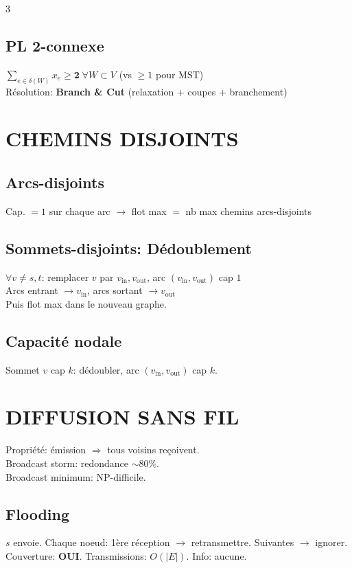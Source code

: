 \documentclass[a4paper,4pt]{article}
\begin{document}
\begin{multicols}{3}
\subsection{PL 2-connexe}
$\sum_{e\in\delta(W)}x_e\geq \mathbf{2}\;\forall W\subset V$ (vs $\geq 1$ pour MST)\\
R\'esolution: \textbf{Branch \& Cut} (relaxation + coupes + branchement)

\section{CHEMINS DISJOINTS}

\subsection{Arcs-disjoints}
Cap. $=1$ sur chaque arc $\to$ flot max $=$ nb max chemins arcs-disjoints

\subsection{Sommets-disjoints: D\'edoublement}
$\forall v\neq s,t$: remplacer $v$ par $v_{\text{in}},v_{\text{out}}$, arc $(v_{\text{in}},v_{\text{out}})$ cap $1$\\
Arcs entrant $\to v_{\text{in}}$, arcs sortant $\to v_{\text{out}}$\\
Puis flot max dans le nouveau graphe.

\subsection{Capacit\'e nodale}
Sommet $v$ cap $k$: d\'edoubler, arc $(v_{\text{in}},v_{\text{out}})$ cap $k$.

\section{DIFFUSION SANS FIL}

Propri\'et\'e: \'emission $\Rightarrow$ tous voisins re\c{c}oivent.\\
Broadcast storm: redondance $\sim$80\%.\\
Broadcast minimum: NP-difficile.

\subsection{Flooding}
$s$ envoie. Chaque noeud: 1\`ere r\'eception $\to$ retransmettre. Suivantes $\to$ ignorer.\\
Couverture: \textbf{OUI}. Transmissions: $O(|E|)$. Info: aucune.


\end{multicols}
\end{document}
